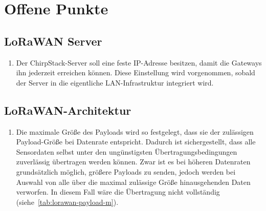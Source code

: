 %
%

\chapter{Offene Punkte}

\section{LoRaWAN Server}
\begin{enumerate}
	\item Der ChirpStack-Server soll eine feste IP-Adresse besitzen, damit die Gateways ihn jederzeit erreichen können. Diese Einstellung wird vorgenommen, sobald der Server in die eigentliche LAN-Infrastruktur integriert wird.
\end{enumerate}

\section{LoRaWAN-Architektur \label{openPoints:LoRaWANArch}}
\begin{enumerate}
	\item Die maximale Größe des Payloads wird so festgelegt, dass sie der zulässigen Payload-Größe bei Datenrate  entspricht. Dadurch ist sichergestellt, dass alle Sensordaten selbst unter den ungünstigsten Übertragungsbedingungen zuverlässig übertragen werden können. Zwar ist es bei höheren Datenraten grundsätzlich möglich, größere Payloads zu senden, jedoch werden bei Auswahl von  alle über die maximal zulässige Größe hinausgehenden Daten verworfen. In diesem Fall wäre die Übertragung nicht vollständig (siehe~\autoref{tab:lorawan-payload-m}).
	\end{enumerate}
	